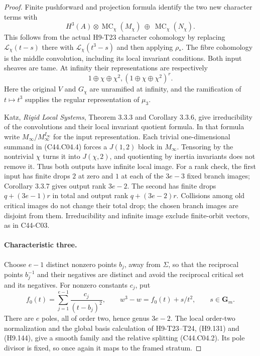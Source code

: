 \begin{proof}
Finite pushforward and projection formula identify the two new
character terms with
\[
          H^3(A)\otimes\operatorname{MC}_\chi(M_\chi)
                    \ \oplus\ 
                    \operatorname{MC}_\chi(N_\chi).
 \tag{C44.C04.3}
\]
This follows from the actual H9-T23 character cohomology by replacing
$\mathcal L_\chi(t-s)$ there with
$\mathcal L_\chi(t^3-s)$ and then applying $\rho_*$. The fibre
cohomology is the middle convolution, including its local invariant
conditions. Both input sheaves are tame. At infinity their
representations are respectively
\[
                 1\oplus\chi\oplus\chi^2,
                (1\oplus\chi\oplus\chi^2)^{r}.
 \tag{C44.C04.4}
\]
Here the original $V$ and $G_\chi$ are unramified at infinity,
and the ramification of $t\mapsto t^3$ supplies the regular
representation of $\mu_3$.

Katz, \emph{Rigid Local Systems}, Theorem 3.3.3 and Corollary 3.3.6,
give irreducibility of the convolutions and their local invariant
quotient formula. In that formula write
$M_\infty/M_\infty^{I_\infty}$ for the input representation.
Each trivial one-dimensional summand in (C44.C04.4) forces a
$J(1,2)$ block in $M_\infty$. Tensoring by the nontrivial $\chi$
turns it into $J(\chi,2)$, and quotienting by inertia invariants
does not remove it. Thus both outputs have infinite local image.
For a rank check, the first input has finite drops $2$ at zero
and $1$ at each of the $3e-3$ fixed branch images; Corollary
3.3.7 gives output rank $3e-2$. The second has finite drops
$q+(3e-1)r$ in total and output rank $q+(3e-2)r$.
Collisions among old critical images do not change their total
drop; the chosen branch images are disjoint from them.
Irreducibility and infinite image exclude finite-orbit vectors,
as in C44-C03.

\paragraph{Characteristic three.}
Choose $e-1$ distinct nonzero points $b_j$, away from $\Sigma$, so
that the reciprocal points $b_j^{-1}$ and their negatives are
distinct and avoid the reciprocal critical set and its negatives.
For nonzero constants $c_j$, put
\[
 f_0(t)=\sum_{j=1}^{e-1}\frac{c_j}{(t-b_j)^2},
 \qquad w^3-w=f_0(t)+s/t^2,\qquad s\in\mathbf G_m.
 \tag{C44.C04.5}
\]
There are $e$ poles, all of order two, hence genus $3e-2$.
The local order-two normalization and the global basis calculation
of H9-T23--T24, (H9.131) and (H9.144), give a smooth family and
the relative splitting (C44.C04.2). Its pole divisor is fixed,
so once again it maps to the framed stratum.


\end{proof}
